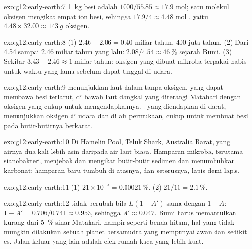 \begin{solution}{exo:g12:early-earth:7}
\qty{1}{kg} besi adalah $1000/55.85 \approx 17.9$ mol; satu molekul oksigen
mengikat empat ion besi, sehingga $17.9/4 \approx 4.48$ mol , yaitu
$4.48 \times 32.00 \approx \qty{143}{g}$ oksigen.
\end{solution}

\begin{solution}{exo:g12:early-earth:8}
(1) $2.46 - 2.06 = 0.40$ miliar tahun, 400 juta tahun. (2) Dari 4.54 sampai
2.46 miliar tahun yang lalu: $2.08/4.54 \approx \qty{46}{\percent}$ sejarah
Bumi. (3) Sekitar $3.43 - 2.46 \approx 1$ miliar tahun: oksigen yang dibuat
mikroba terpakai habis untuk waktu yang lama sebelum dapat tinggal di udara.
\end{solution}

\begin{solution}{exo:g12:early-earth:9}
 menunjukkan laut dalam tanpa oksigen, yang dapat membawa
besi terlarut, di bawah laut dangkal yang diterangi Matahari dengan oksigen
yang cukup untuk mengendapkannya. , yang diendapkan di darat,
menunjukkan oksigen di udara dan di air permukaan, cukup untuk membuat besi
pada butir-butirnya berkarat.
\end{solution}

\begin{solution}{exo:g12:early-earth:10}
Di Hamelin Pool, Teluk Shark, Australia Barat, yang airnya dua kali lebih asin
daripada air laut biasa. Hamparan mikroba, terutama sianobakteri, menjebak dan
mengikat butir-butir sedimen dan menumbuhkan karbonat; hamparan baru tumbuh di
atasnya, dan seterusnya, lapis demi lapis.
\end{solution}

\begin{solution}{exo:g12:early-earth:11}
(1) $21 \times 10^{-5} = \qty{0.00021}{\percent}$. (2) $21/10 =
\qty{2.1}{\percent}$.
\end{solution}

\begin{solution}{exo:g12:early-earth:12}
 tidak berubah bila $L(1 - A')$ sama dengan $1 - A$:
$1 - A' = 0.706/0.741 \approx 0.953$, sehingga $A' \approx 0.047$. Bumi harus
memantulkan kurang dari \qty{5}{\percent} sinar Matahari, hampir seperti benda
hitam, hal yang tidak mungkin dilakukan sebuah planet bersamudra yang mempunyai
awan dan sedikit es. Jalan keluar yang lain adalah efek rumah kaca yang lebih
kuat.
\end{solution}

